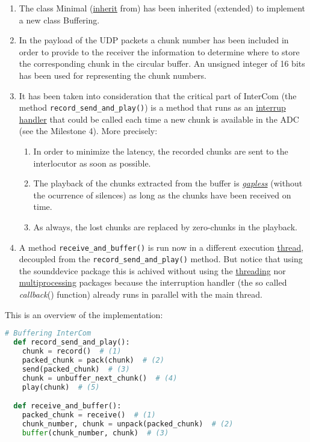 \begin{enumerate}
\item The class Minimal
  (\href{https://en.wikipedia.org/wiki/Inheritance_(object-oriented_programming)}{inherit}
  from) has been inherited (extended) to implement a new class
  Buffering.
\item In the payload of the UDP packets a chunk number has been
  included in order to provide to the receiver the information to
  determine where to store the corresponding chunk in the circular
  buffer. An unsigned integer of 16 bits has been used for
  representing the chunk numbers.
\item It has been taken into consideration that the critical part of
  InterCom (the method \verb|record_send_and_play()|) is a method that
  runs as an
  \href{https://en.wikipedia.org/wiki/Interrupt_handler}{interrup
    handler} that could be called each time a new chunk is available
  in the ADC (see the Milestone 4). More precisely:
  \begin{enumerate}
  \item In order to minimize the latency, the recorded chunks are sent
    to the interlocutor as soon as possible.
  \item The playback of the chunks extracted from the buffer is
    \href{https://en.wikipedia.org/wiki/Gapless_playback}{\emph{gapless}}
    (without the ocurrence of silences) as long as the chunks have
    been received on time.
  \item As always, the lost chunks are replaced by zero-chunks
    in the playback.
  \end{enumerate}
\item A method \verb|receive_and_buffer()| is run now in a different
  execution
  \href{https://en.wikipedia.org/wiki/Thread_(computing)}{thread},
  decoupled from the \verb|record_send_and_play()| method. But notice
  that using the sounddevice package this is achived without using the
  \href{https://docs.python.org/3/library/threading.html}{threading}
  nor
  \href{https://docs.python.org/3/library/multiprocessing.html}{multiprocessing}
  packages because the interruption handler (the so called
  \emph{callback}() function) already runs in parallel with the main
  thread.
\end{enumerate}

This is an overview of the implementation:

\begin{lstlisting}[language=Python]
  # Buffering InterCom
  def record_send_and_play():
    chunk = record()  # (1)
    packed_chunk = pack(chunk)  # (2)
    send(packed_chunk)  # (3)
    chunk = unbuffer_next_chunk()  # (4)
    play(chunk)  # (5)

  def receive_and_buffer():
    packed_chunk = receive()  # (1)
    chunk_number, chunk = unpack(packed_chunk)  # (2)
    buffer(chunk_number, chunk)  # (3)
\end{lstlisting}

